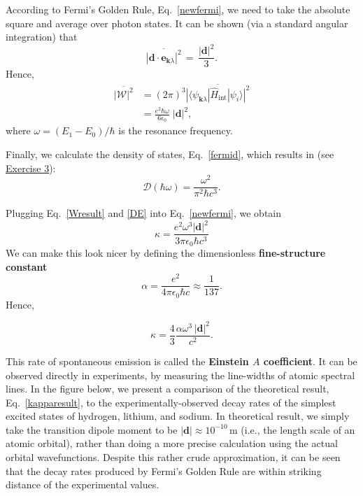 \documentclass[prx,12pt]{revtex4-2}
\begin{document}
According to Fermi's Golden Rule, Eq.~\eqref{newfermi}, we need to
take the absolute square and average over photon states.  It can be
shown (via a standard angular integration) that
\begin{equation}
  \overline{|\mathbf{d}\cdot \mathbf{e}_{\mathbf{k}\lambda}|^2}
  \,=\, \frac{|\mathbf{d}|^2}{3}.
\end{equation}
Hence,
\begin{align}
  \overline{|\mathcal{W}|^2} &= (2\pi)^3
  \overline{|\langle \psi_{\mathbf{k}\lambda} | \hat{H}_{\mathrm{int}}|\psi_i\rangle|^2} \\
  &= \frac{e^2\hbar \omega}{6\epsilon_0} \; |\mathbf{d}|^2,
  \label{Wresult}
\end{align}
where $\omega = (E_1 - E_0)/\hbar$ is the resonance frequency.

Finally, we calculate the density of states, Eq.~\eqref{fermid}, which
results in (see \hyperref[ex:DE]{Exercise 3}):
\begin{equation}
  \mathcal{D}(\hbar \omega) = \frac{\omega^2}{\pi^2\hbar c^3}.
  \label{DE}
\end{equation}

Plugging Eq.~\eqref{Wresult} and \eqref{DE} into Eq.~\eqref{newfermi},
we obtain
\begin{equation}
  \kappa = \frac{e^2 \omega^3 |\mathbf{d}|^2}{3\pi \epsilon_0 \hbar c^3}
\end{equation}
We can make this look nicer by defining the dimensionless
\textbf{fine-structure constant}
\begin{equation}
  \alpha = \frac{e^2}{4\pi\epsilon_0\hbar c} \approx \frac{1}{137}.
  \label{alpha}
\end{equation}
Hence,
\begin{framed}
  \begin{equation}
    \kappa = \frac{4}{3} \frac{\alpha \omega^3\, |\mathbf{d}|^2}{c^2}.
    \label{kapparesult}
  \end{equation}
\end{framed}

This rate of spontaneous emission is called the \textbf{Einstein $A$
  coefficient}.  It can be observed directly in experiments, by
measuring the line-widths of atomic spectral lines.  In the figure
below, we present a comparison of the theoretical result,
Eq.~\eqref{kapparesult}, to the experimentally-observed decay rates of
the simplest excited states of hydrogen, lithium, and sodium.  In
theoretical result, we simply take the transition dipole moment to be
$|\mathbf{d}| \approx 10^{-10}\,\mathrm{m}$ (i.e., the length scale of
an atomic orbital), rather than doing a more precise calculation using
the actual orbital wavefunctions.  Despite this rather crude
approximation, it can be seen that the decay rates produced by Fermi's
Golden Rule are within striking distance of the experimental values.
\end{document}
